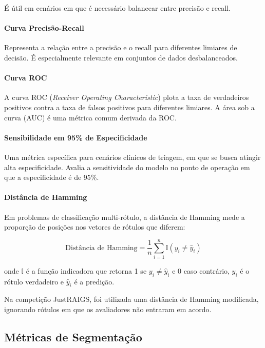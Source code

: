 \documentclass[12pt]{article}
\begin{document}
É útil em cenários em que é necessário balancear entre precisão e recall.

\paragraph{Curva Precisão-Recall} Representa a relação entre a precisão e o recall para diferentes limiares de decisão. É especialmente relevante em conjuntos de dados desbalanceados.

\paragraph{Curva ROC} A curva ROC (\emph{Receiver Operating Characteristic}) plota a taxa de verdadeiros positivos contra a taxa de falsos positivos para diferentes limiares. A área sob a curva (AUC) é uma métrica comum derivada da ROC.

\paragraph{Sensibilidade em 95\% de Especificidade} Uma métrica específica para cenários clínicos de triagem, em que se busca atingir alta especificidade. Avalia a sensitividade do modelo no ponto de operação em que a especificidade é de 95\%.

\paragraph{Distância de Hamming}  
Em problemas de classificação multi-rótulo, a distância de Hamming mede a proporção de posições nos vetores de rótulos que diferem:

\begin{equation}
\text{Distância de Hamming} = \frac{1}{n} \sum_{i=1}^{n} \mathbb{I}(y_i \neq \hat{y}_i)
\end{equation}

onde \( \mathbb{I} \) é a função indicadora que retorna 1 se \( y_i \neq \hat{y}_i \) e 0 caso contrário, \( y_i \) é o rótulo verdadeiro e \( \hat{y}_i \) é a predição.

Na competição JustRAIGS, foi utilizada uma distância de Hamming modificada, ignorando rótulos em que os avaliadores não entraram em acordo.


\subsection{Métricas de Segmentação}
\label{sec:metrics_segmentation}
\end{document}
